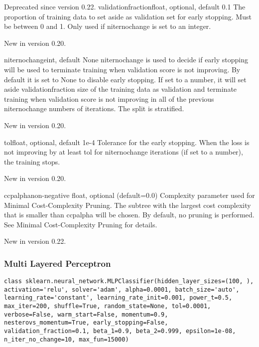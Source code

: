\documentclass[12pt]{article}
\begin{document}
\begin{itemize}
Deprecated since version 0.22.
validation\textunderscore fractionfloat, optional, default 0.1
The proportion of training data to set aside as validation set for early stopping. Must be between 0 and 1. Only used if n\textunderscore iter\textunderscore no\textunderscore change is set to an integer.

New in version 0.20.

n\textunderscore iter\textunderscore no\textunderscore changeint, default None
n\textunderscore iter\textunderscore no\textunderscore change is used to decide if early stopping will be used to terminate training when validation score is not improving. By default it is set to None to disable early stopping. If set to a number, it will set aside validation\textunderscore fraction size of the training data as validation and terminate training when validation score is not improving in all of the previous n\textunderscore iter\textunderscore no\textunderscore change numbers of iterations. The split is stratified.

New in version 0.20.

tolfloat, optional, default 1e-4
Tolerance for the early stopping. When the loss is not improving by at least tol for n\textunderscore iter\textunderscore no\textunderscore change iterations (if set to a number), the training stops.

New in version 0.20.

ccp\textunderscore alphanon-negative float, optional (default=0.0)
Complexity parameter used for Minimal Cost-Complexity Pruning. The subtree with the largest cost complexity that is smaller than ccp\textunderscore alpha will be chosen. By default, no pruning is performed. See Minimal Cost-Complexity Pruning for details.

New in version 0.22.
\end{itemize}

\newpage
\subsubsection{Multi Layered Perceptron}
\begin{lstlisting}
class sklearn.neural_network.MLPClassifier(hidden_layer_sizes=(100, ), activation='relu', solver='adam', alpha=0.0001, batch_size='auto', learning_rate='constant', learning_rate_init=0.001, power_t=0.5, max_iter=200, shuffle=True, random_state=None, tol=0.0001, verbose=False, warm_start=False, momentum=0.9, nesterovs_momentum=True, early_stopping=False, validation_fraction=0.1, beta_1=0.9, beta_2=0.999, epsilon=1e-08, n_iter_no_change=10, max_fun=15000)
\end{lstlisting}
\end{document}
